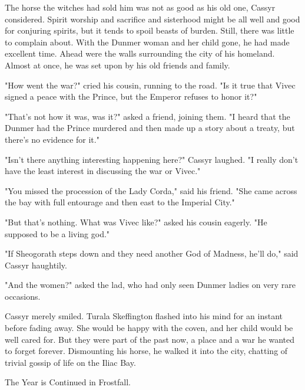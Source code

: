 The horse the witches had sold him was not as good as his old one, Cassyr considered. Spirit worship and sacrifice and sisterhood might be all well and good for conjuring spirits, but it tends to spoil beasts of burden. Still, there was little to complain about. With the Dunmer woman and her child gone, he had made excellent time. Ahead were the walls surrounding the city of his homeland. Almost at once, he was set upon by his old friends and family.

"How went the war?" cried his cousin, running to the road. "Is it true that Vivec signed a peace with the Prince, but the Emperor refuses to honor it?"

"That's not how it was, was it?" asked a friend, joining them. "I heard that the Dunmer had the Prince murdered and then made up a story about a treaty, but there's no evidence for it."

"Isn't there anything interesting happening here?" Cassyr laughed. "I really don't have the least interest in discussing the war or Vivec."

"You missed the procession of the Lady Corda," said his friend. "She came across the bay with full entourage and then east to the Imperial City."

"But that's nothing. What was Vivec like?" asked his cousin eagerly. "He supposed to be a living god."

"If Sheogorath steps down and they need another God of Madness, he'll do," said Cassyr haughtily.

"And the women?" asked the lad, who had only seen Dunmer ladies on very rare occasions.

Cassyr merely smiled. Turala Skeffington flashed into his mind for an instant before fading away. She would be happy with the coven, and her child would be well cared for. But they were part of the past now, a place and a war he wanted to forget forever. Dismounting his horse, he walked it into the city, chatting of trivial gossip of life on the Iliac Bay.

The Year is Continued in Frostfall.